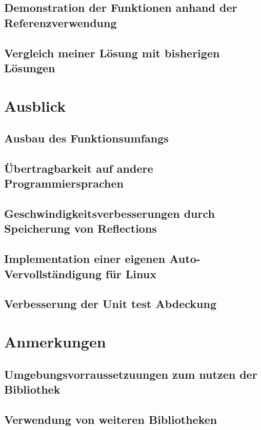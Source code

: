 \documentclass[a4paper,12pt,titlepage,ngerman]{article}
\begin{document}
\begin{sloppypar}
  \subsection{Demonstration der Funktionen anhand der Referenzverwendung}\label{subsec:demonstration}
  \subsection{Vergleich meiner Lösung mit bisherigen Lösungen}\label{subsec:Comparison}
  \section{Ausblick}\label{sec:Future}
  \subsection{Ausbau des Funktionsumfangs}\label{subsec:MoreFunctions}
  \subsection{Übertragbarkeit auf andere Programmiersprachen}\label{subsec:PortabilityToOtherLangs}
  \subsection{Geschwindigkeitsverbesserungen durch Speicherung von Reflections}\label{subsec:StoringReflections}
  \subsection{Implementation einer eigenen Auto-Vervollständigung für Linux}\label{subsec:Autocomplete}
  \subsection{Verbesserung der Unit test Abdeckung}\label{subsec:MoreUnitTests}
  \section{Anmerkungen}\label{sec:AdditionalNotes}
  \subsection{Umgebungsvorraussetzuungen zum nutzen der Bibliothek}\label{subsec:SystemRequirements}
  \subsection{Verwendung von weiteren Bibliotheken}\label{subsec:UsageOfLibraries}

\end{sloppypar}
\end{document}
